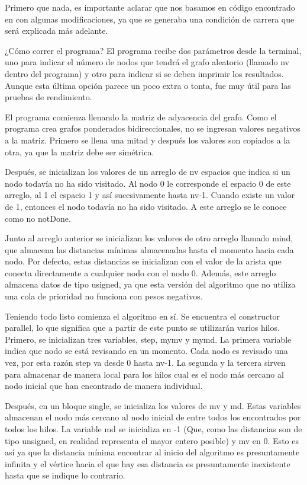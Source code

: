 \documentclass[11pt]{article}
\begin{document}
Primero que nada, es importante aclarar que nos basamos en código encontrado en \cite{Matloff} con algunas modificaciones, ya que se generaba una condición de carrera que será explicada más adelante.
\par 
¿Cómo correr el programa? El programa recibe dos parámetros desde la terminal, uno para indicar el número de nodos que tendrá el grafo aleatorio (llamado nv dentro del programa) y otro para indicar si se deben imprimir los resultados. Aunque esta última opción parece un poco extra o tonta, fue muy útil para las pruebas de rendimiento.
\par 
El programa comienza llenando la matriz de adyacencia del grafo. Como el programa crea grafos ponderados bidireccionales, no se ingresan valores negativos a la matriz. Primero se llena una mitad y después los valores son copiados a la otra, ya que la matriz debe ser simétrica.
\par 
Después, se inicializan los valores de un arreglo de nv espacios que indica si un nodo todavía no ha sido visitado. Al nodo 0 le corresponde el espacio 0 de este arreglo, al 1 el espacio 1 y así sucesivamente hasta nv-1. Cuando existe un valor de 1, entonces el nodo todavía no ha sido visitado. A este arreglo se le conoce como no notDone.
\par
Junto al arreglo anterior se inicializan los valores de otro arreglo llamado mind, que almacena las distancias mínimas almacenadas hasta el momento hacia cada nodo. Por defecto, estas distancias se inicializan con el valor de la arista que conecta directamente a cualquier nodo con el nodo 0. Además, este arreglo almacena datos de tipo usigned, ya que esta versión del algoritmo que no utiliza una cola de prioridad no funciona con pesos negativos. 
\par
Teniendo todo listo comienza el algoritmo en sí. Se encuentra el constructor parallel, lo que significa que a partir de este punto se utilizarán varios hilos. Primero, se inicializan tres variables, step, mymv y mymd. La primera variable indica que nodo se está revisando en un momento. Cada nodo es revisado una vez, por esta razón step va desde 0 hasta nv-1. La segunda y la tercera sirven para almacenar de manera local para los hilos cual es el nodo más cercano al nodo inicial que han encontrado de manera individual. 
\par
Después, en un bloque single, se inicializa los valores de mv y md. Estas variables almacenan el nodo más cercano al nodo inicial de entre todos los encontrados por todos los hilos. La variable md se inicializa en -1 (Que, como las distancias son de tipo unsigned, en realidad representa el mayor entero posible) y mv en 0. Esto es así ya que la distancia mínima encontrar al inicio del algoritmo es presuntamente infinita y el vértice hacia el que hay esa distancia es presuntamente inexistente hasta que se indique lo contrario.
\end{document}
